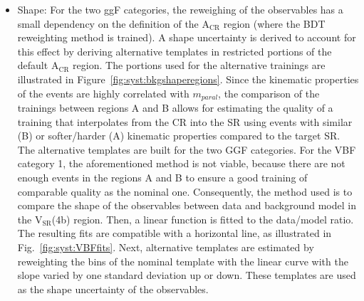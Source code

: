 \begin{itemize}
    \item {Shape:} For the two ggF categories, the reweighing of the observables has a small dependency on the definition of the $\mathrm{A_{CR}}$ region (where the BDT reweighting method is trained). A shape uncertainty is derived to account for this effect by deriving alternative templates in restricted portions of the default $\mathrm{A_{CR}}$ region. The portions used for the alternative trainings are illustrated in Figure~\ref{fig:syst:bkgshaperegions}. Since the kinematic properties of the events are highly correlated with $m_{paral}$, the comparison of the trainings between regions A and B allows for estimating the quality of a training that interpolates from the CR into the SR using events with similar (B) or softer/harder (A) kinematic properties compared to the target SR. The alternative templates are built for the two GGF categories. For the VBF category 1, the aforementioned method is not viable, because there are not enough events in the regions A and B to ensure a good training of comparable quality as the nominal one. Consequently, the method used is to compare the shape of the observables between data and background model in the $\mathrm{V_{SR}}$(4b) region. Then, a linear function is fitted to the data/model ratio. The resulting fits are compatible with a horizontal line, as illustrated in Fig.~\ref{fig:syst:VBFfits}. Next, alternative templates are estimated by reweighting the bins of the nominal template with the linear curve with the slope varied by one standard deviation up or down. These templates are used as the shape uncertainty of the observables.
\end{itemize}

